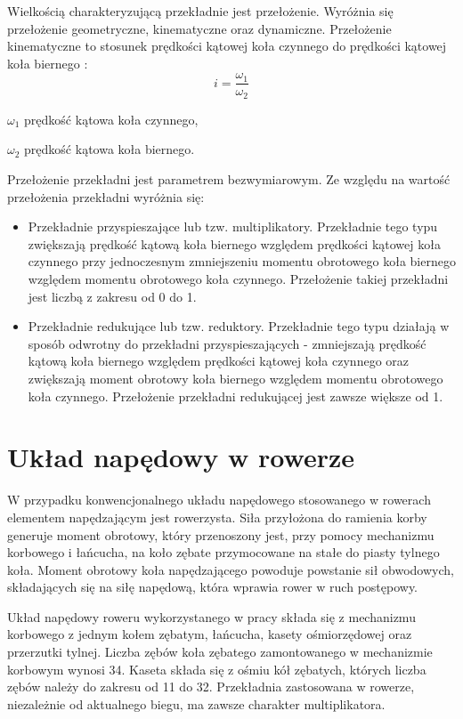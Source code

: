 Wielkością charakteryzującą przekładnie jest przełożenie. Wyróżnia się przełożenie geometryczne, kinematyczne oraz dynamiczne. Przełożenie kinematyczne to stosunek prędkości kątowej koła czynnego do prędkości kątowej koła biernego \cite{przekladnie}:
\begin{equation}
    i = \frac{\omega_1}{\omega_2}
    \label{eq:przelozenieKinematyczne}
\end{equation}
\begin{eqwhere}[2cm]
	\item[$\omega_1$] prędkość kątowa koła czynnego,
	\item[$\omega_2$] prędkość kątowa koła biernego.
\end{eqwhere}

Przełożenie przekładni jest parametrem bezwymiarowym. Ze względu na wartość przełożenia przekładni wyróżnia się:
\begin{itemize}
\item
Przekładnie przyspieszające lub tzw. multiplikatory. Przekładnie tego typu zwiększają prędkość kątową koła biernego względem prędkości kątowej koła czynnego przy jednoczesnym zmniejszeniu momentu obrotowego koła biernego względem momentu obrotowego koła czynnego. Przełożenie takiej przekładni jest liczbą z zakresu od 0 do 1.
\item
Przekładnie redukujące lub tzw. reduktory. Przekładnie tego typu działają w sposób odwrotny do przekładni przyspieszających - zmniejszają prędkość kątową koła biernego względem prędkości kątowej koła czynnego oraz zwiększają moment obrotowy koła biernego względem momentu obrotowego koła czynnego. Przełożenie przekładni redukującej jest zawsze większe od 1.
\end{itemize} 
\section{Układ napędowy w rowerze}
W przypadku konwencjonalnego układu napędowego stosowanego w rowerach elementem napędzającym jest rowerzysta. Siła przyłożona do ramienia korby generuje moment obrotowy, który przenoszony jest, przy pomocy mechanizmu korbowego i łańcucha, na koło zębate przymocowane na stałe do piasty tylnego koła. Moment obrotowy koła napędzającego powoduje powstanie sił obwodowych, składających się na siłę napędową, która wprawia rower w ruch postępowy.

Układ napędowy roweru wykorzystanego w pracy składa się z mechanizmu korbowego z jednym kołem zębatym, łańcucha, kasety ośmiorzędowej oraz przerzutki tylnej. Liczba zębów koła zębatego zamontowanego w mechanizmie korbowym wynosi 34. Kaseta składa się z ośmiu kół zębatych, których liczba zębów należy do zakresu od 11 do 32. Przekładnia zastosowana w rowerze, niezależnie od aktualnego biegu, ma zawsze charakter multiplikatora.

